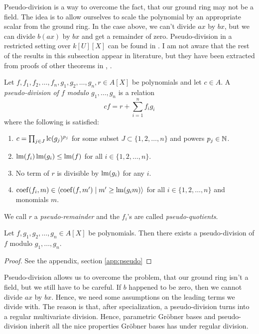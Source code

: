 Pseudo-division is a way to overcome the fact, that our ground ring may not be a field. The idea is to allow ourselves to scale the polynomial by an appropriate scalar from the ground ring. In the case above, we can't divide $ax$ by $bx$, but we can divide $b(ax)$ by $bx$ and get a remainder of zero. Pseudo-division in a restricted setting over $k[U][X]$ can be found in \cite{IVA}. I am not aware that the rest of the results in this subsection appear in literature, but they have been extracted from proofs of other theorems in \cite{grb_covers}, \cite{MONTES20101391}.

\begin{definition}
  Let $f, f_{1}, f_{2}, \dots, f_{n}, g_{1}, g_{2}, \dots, g_{n}, r \in A[X]$ be polynomials and let $c \in A$. A \textit{pseudo-division of $f$ modulo $g_{1}, \dots, g_{n}$} is a relation
  \[cf = r + \sum_{i=1}^{n} f_{i}g_{i}\]
  where the following is satisfied:
  \begin{enumerate}
    \item $c = \prod_{j\in J} \operatorname{lc}(g_{j})^{p_{j}}$ for some subset $J \subset \{1, 2, \dots, n\}$ and powers $p_{j} \in \mathbb{N}$.
    \item $\operatorname{lm}(f_{i})\operatorname{lm}(g_{i}) \leq \operatorname{lm}(f)$ for all $i \in \{1, 2, \dots, n\}$.
    \item No term of $r$ is divisible by $\operatorname{lm}(g_{i})$ for any $i$.
    \item $\operatorname{coef}(f_{i}, m) \in \langle \operatorname{coef}(f, m') \mid m' \geq \operatorname{lm}(g_{i}m) \rangle$ for all $i \in \{1, 2, \dots, n\}$ and monomials $m$.
  \end{enumerate}
  We call $r$ a \textit{pseudo-remainder} and the $f_{i}$'s are called \textit{pseudo-quotients}.
\end{definition}


\begin{theorem}\label{thm:exi_pseudo}
  Let $f, g_{1}, g_{2}, \dots, g_{n} \in A[X]$ be polynomials. Then there exists a pseudo-division of $f$ modulo $g_{1}, \dots, g_{n}$.
\end{theorem}
\begin{proof}
  See the appendix, section \ref{app:pseudo}
\end{proof}

Pseudo-division allows us to overcome the problem, that our ground ring isn't a field, but we still have to be careful. If $b$ happened to be zero, then we cannot divide $ax$ by $bx$. Hence, we need some assumptions on the leading terms we divide with. The reason is that, after specialization, a pseudo-division turns into a regular multivariate division. Hence, parametric Gröbner bases and pseudo-division inherit all the nice properties Gröbner bases has under regular division.

